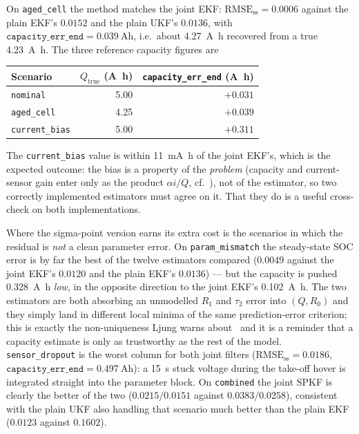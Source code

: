 On \texttt{aged\_cell} the method matches the joint EKF: $\text{RMSE}_\text{ss}=0.0006$
against the plain EKF's $0.0152$ and the plain UKF's $0.0136$, with
$\texttt{capacity\_err\_end}=\SI{+0.039}{\ampere\hour}$, i.e.\ about \SI{4.27}{\ampere\hour}
recovered from a true \SI{4.23}{\ampere\hour}.  The three reference capacity figures are
\begin{center}
\begin{tabular}{@{}lrr@{}}
\toprule
Scenario & $Q_\text{true}$ (\si{\ampere\hour}) & \texttt{capacity\_err\_end} (\si{\ampere\hour})\\
\midrule
\texttt{nominal}      & 5.00 & $+0.031$\\
\texttt{aged\_cell}   & 4.25 & $+0.039$\\
\texttt{current\_bias}& 5.00 & $+0.311$\\
\bottomrule
\end{tabular}
\end{center}
The \texttt{current\_bias} value is within \SI{11}{\milli\ampere\hour} of the joint EKF's, which is
the expected outcome: the bias is a property of the \emph{problem} (capacity and current-sensor gain
enter only as the product $\alpha i/Q$, cf.\ \cite{zhao2017observability,lin2018sensorbias}), not of
the estimator, so two correctly implemented estimators must agree on it.  That they do is a useful
cross-check on both implementations.

Where the sigma-point version earns its extra cost is the scenarios in which the residual is
\emph{not} a clean parameter error.  On \texttt{param\_mismatch} the steady-state SOC error is by far the best of the twelve estimators
compared ($0.0049$ against the joint EKF's $0.0120$ and the plain EKF's $0.0136$) --- but the
capacity is pushed \SI{0.328}{\ampere\hour} \emph{low}, in the opposite direction to the joint
EKF's \SI{+0.102}{\ampere\hour}.  The two estimators are both absorbing an unmodelled $R_1$ and
$\tau_2$ error into $(Q,R_0)$ and they simply land in different local minima of the same
prediction-error criterion; this is exactly the non-uniqueness Ljung warns about~\cite{ljung1979ekf}
and it is a reminder that a capacity estimate is only as trustworthy as the rest of the model.
\texttt{sensor\_dropout} is the worst column for both joint filters
($\text{RMSE}_\text{ss}=0.0186$, $\texttt{capacity\_err\_end}=\SI{+0.497}{\ampere\hour}$): a
\SI{15}{\second} stuck voltage during the take-off hover is integrated straight into the parameter
block.  On \texttt{combined} the joint SPKF is clearly the better of the two ($0.0215/0.0151$
against $0.0383/0.0258$), consistent with the plain UKF also handling that scenario much better
than the plain EKF ($0.0123$ against $0.1602$).

